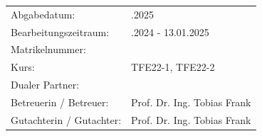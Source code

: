 \documentclass{scrbook} %
\newcommand{\autor}{Luka Tadic}
\newcommand{\abgabe}{13.01.2025}
\newcommand{\bearbeitungszeitraum}{09.10.2024 - 13.01.2025}
\newcommand{\matrikelnr}{5726700}
\newcommand{\kurs}{TFE22-1, TFE22-2}
\newcommand{\firma}{}
\newcommand{\betreuerfirma}{Prof. Dr. Ing. Tobias Frank}
\newcommand{\gutachterdhbw}{Prof. Dr. Ing. Tobias Frank}
\newcommand{\jahr}{Year}
\begin{document}
\begin{titlepage}
\begin{center}
{\fontsize{12pt}{14pt}\selectfont
\begin{tabular}{ll}
Abgabedatum:                    & \quad \abgabe \\
Bearbeitungszeitraum:           & \quad \bearbeitungszeitraum   \\ 
Matrikelnummer:                 & \quad \matrikelnr \\ 
Kurs:                           & \quad \kurs \\
Dualer Partner:                 & \quad \firma \\ %
Betreuerin / Betreuer:          & \quad \betreuerfirma \\ %
Gutachterin / Gutachter:        & \quad \gutachterdhbw \\ [2ex] %
\end{tabular}
}
\end{center}
\end{titlepage}

%

\hypersetup{pageanchor=true}

%
%
%
%
\end{document}
